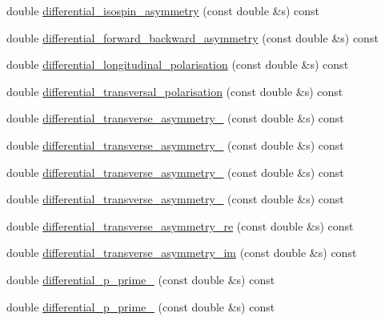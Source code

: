 \begin{DoxyCompactItemize}
\item 
double \hyperlink{classeos_1_1BToKstarDilepton_3_01LargeRecoil_01_4_afa88a0c245558f37d98434d6e1015b1a}{differential\_\-isospin\_\-asymmetry} (const double \&s) const 
\item 
double \hyperlink{classeos_1_1BToKstarDilepton_3_01LargeRecoil_01_4_aa04892629835230c6c872ad23856ed23}{differential\_\-forward\_\-backward\_\-asymmetry} (const double \&s) const 
\item 
double \hyperlink{classeos_1_1BToKstarDilepton_3_01LargeRecoil_01_4_aa84eeff61540f463dbeeca9849abbfa8}{differential\_\-longitudinal\_\-polarisation} (const double \&s) const 
\item 
double \hyperlink{classeos_1_1BToKstarDilepton_3_01LargeRecoil_01_4_a6de27e23e4ca3173c2ea165a6582635f}{differential\_\-transversal\_\-polarisation} (const double \&s) const 
\item 
double \hyperlink{classeos_1_1BToKstarDilepton_3_01LargeRecoil_01_4_add8dad95050fb3a80b4505ba984e9a62}{differential\_\-transverse\_\-asymmetry\_} (const double \&s) const 
\item 
double \hyperlink{classeos_1_1BToKstarDilepton_3_01LargeRecoil_01_4_a36fc5792c391c669945edf471c1d4351}{differential\_\-transverse\_\-asymmetry\_} (const double \&s) const 
\item 
double \hyperlink{classeos_1_1BToKstarDilepton_3_01LargeRecoil_01_4_a6788c2ed0fb87a3d0d5793c74abbd38d}{differential\_\-transverse\_\-asymmetry\_} (const double \&s) const 
\item 
double \hyperlink{classeos_1_1BToKstarDilepton_3_01LargeRecoil_01_4_afdbdfe18da3c1b6984950b4fd887cfd4}{differential\_\-transverse\_\-asymmetry\_} (const double \&s) const 
\item 
double \hyperlink{classeos_1_1BToKstarDilepton_3_01LargeRecoil_01_4_af6af253a6e5b782e3d3f96d2cbc4baaf}{differential\_\-transverse\_\-asymmetry\_\-re} (const double \&s) const 
\item 
double \hyperlink{classeos_1_1BToKstarDilepton_3_01LargeRecoil_01_4_ab43ff9e7f2d5c4c3e0d30f4303c85bc8}{differential\_\-transverse\_\-asymmetry\_\-im} (const double \&s) const 
\item 
double \hyperlink{classeos_1_1BToKstarDilepton_3_01LargeRecoil_01_4_a1919215afd68af87e39b87fed3b92aad}{differential\_\-p\_\-prime\_} (const double \&s) const 
\item 
double \hyperlink{classeos_1_1BToKstarDilepton_3_01LargeRecoil_01_4_aae7b7fca81060e9289d17f9d5b57b405}{differential\_\-p\_\-prime\_} (const double \&s) const 

\end{DoxyCompactItemize}
